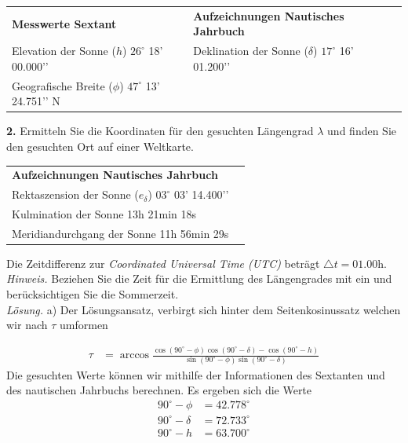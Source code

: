 \begin{refsection}
\begin{center}
\renewcommand{\arraystretch}{1.5}
\begin{tabular}{llll}
\textbf{Messwerte Sextant} & \textbf{Aufzeichnungen Nautisches Jahrbuch} \\
Elevation der Sonne ($h$) $26^{\circ}$ 18’ 00.000’’ & Deklination der Sonne ($\delta$)  $17^{\circ}$ 16’ 01.200’’ \\
Geografische Breite ($\phi$) $47^{\circ}$ 13’ 24.751’’ N
\end{tabular}
\end{center}


\textbf{2.} Ermitteln Sie die Koordinaten für den gesuchten Längengrad $\lambda$ und finden Sie den gesuchten Ort auf einer Weltkarte.

\begin{center}
\renewcommand{\arraystretch}{1.5}
\begin{tabular}{ll}
\textbf{Aufzeichnungen Nautisches Jahrbuch} \\
Rektaszension der Sonne ($e_\delta$) $03^{\circ}$ 03’ 14.400’’ \\
Kulmination der Sonne 13h 21min 18s \\
Meridiandurchgang der Sonne 11h 56min 29s
\end{tabular}
\end{center}

Die Zeitdifferenz zur \textit{Coordinated Universal Time (UTC)} beträgt $\triangle{t}=01.00$h. \\

\textit{Hinweis.} Beziehen Sie die Zeit für die Ermittlung des Längengrades mit ein und berücksichtigen Sie die Sommerzeit. \\

\textit{Lösung.} \quad a) Der Lösungsansatz, verbirgt sich hinter dem Seitenkosinussatz welchen wir nach $\tau$ umformen

\begin{align*}
\tau &= \arccos 
\frac{ \cos(90^{\circ} - \phi) \cos(90^{\circ} - \delta) - \cos(90^{\circ} - h)} {\sin(90^{\circ} - \phi)\sin(90^{\circ} - \delta)}
\end{align*}
Die gesuchten Werte können wir mithilfe der Informationen des Sextanten und des nautischen Jahrbuchs berechnen. Es ergeben sich die Werte
\begin{align*}
90^{\circ} - \phi &= 42.778^{\circ}
\\
90^{\circ} - \delta &= 72.733^{\circ}
\\
90^{\circ} - h &= 63.700^{\circ}
\end{align*}


\end{refsection}
